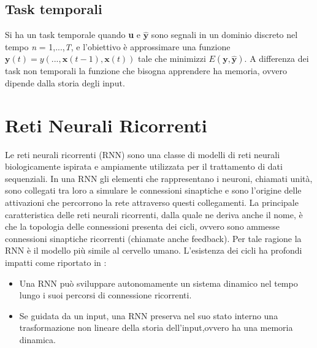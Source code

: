 \subsection{Task temporali}\label{sec:tt}
Si ha un task temporale quando \textbf{u} e $\hat{\mathbf{y}}$ sono segnali in un dominio discreto nel tempo \textit{n} = 1,...,\textit{T}, e l'obiettivo è approssimare una funzione $\mathbf{y}(\mathit{t})=y(..., \mathbf{x}(\mathit{t - 1}),\mathbf{x}(\mathit{t}) )$
tale che minimizzi $E(\mathbf{y},\hat{\mathbf{y}})$.
A differenza dei task non temporali la funzione che bisogna apprendere ha memoria, ovvero dipende dalla storia degli input.
\section{Reti Neurali Ricorrenti}\label{sec:rnn}

Le reti neurali ricorrenti (RNN) sono una classe di modelli di reti neurali biologicamente ispirata e ampiamente utilizzata per il trattamento di dati sequenziali. In una RNN gli elementi che rappresentano i neuroni, chiamati unità, sono collegati tra loro a simulare le connessioni sinaptiche e sono l'origine delle attivazioni che percorrono la rete attraverso questi collegamenti. La principale caratteristica delle reti neurali ricorrenti, dalla quale ne deriva anche il nome, è che la topologia delle connessioni presenta dei cicli, ovvero sono ammesse connessioni sinaptiche ricorrenti (chiamate anche feedback). Per tale ragione la RNN è il modello più simile al cervello umano. L'esistenza dei cicli ha profondi impatti come riportato in \cite{RCapproch:paper}:
\begin{itemize}
	\item Una RNN può sviluppare autonomamente un sistema dinamico nel tempo lungo i suoi percorsi di connessione ricorrenti.
	\item Se guidata da un input, una RNN preserva nel suo stato interno una trasformazione non lineare della storia dell'input,ovvero ha una memoria dinamica.\\
\end{itemize}

